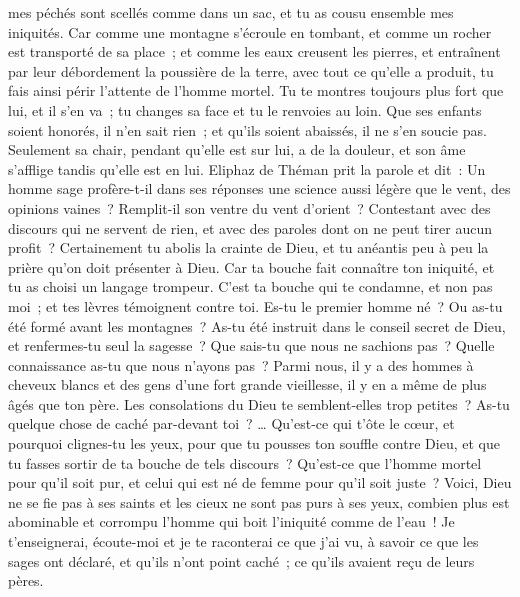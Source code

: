 \begin{multicols}{2}
mes péchés sont scellés comme dans un sac, et tu as cousu ensemble mes iniquités.
Car comme une montagne s'écroule en tombant, et comme un rocher est transporté de sa place~; 
 et comme les eaux creusent les pierres, et entraînent par leur débordement la poussière de la terre, avec tout ce qu'elle a produit, tu fais ainsi périr l'attente de l'homme mortel.
Tu te montres toujours plus fort que lui, et il s'en va~; tu changes sa face et tu le renvoies au loin.
Que ses enfants soient honorés, il n'en sait rien~; et qu'ils soient abaissés, il ne s'en soucie pas.
Seulement sa chair, pendant qu'elle est sur lui, a de la douleur, et son âme s'afflige tandis qu'elle est en lui.
\VerseOne{}Eliphaz de Théman prit la parole et dit~:
Un homme sage profère-t-il dans ses réponses une science aussi légère que le vent, des opinions vaines~? Remplit-il son ventre du vent d'orient~?
Contestant avec des discours qui ne servent de rien, et avec des paroles dont on ne peut tirer aucun profit~?
Certainement tu abolis la crainte de Dieu, et tu anéantis peu à peu la prière qu'on doit présenter à Dieu. 
 Car ta bouche fait connaître ton iniquité, et tu as choisi un langage trompeur. 
C'est ta bouche qui te condamne, et non pas moi~; et tes lèvres témoignent contre toi. 
Es-tu le premier homme né~? Ou as-tu été formé avant les montagnes~?
As-tu été instruit dans le conseil secret de Dieu, et renfermes-tu seul la sagesse~?
Que sais-tu que nous ne sachions pas~? Quelle connaissance as-tu que nous n'ayons pas~?
Parmi nous, il y a des hommes à cheveux blancs et des gens d'une fort grande vieillesse, il y en a même de plus âgés que ton père. 
Les consolations du Dieu te semblent-elles trop petites~? As-tu quelque chose de caché par-devant toi~? …
Qu'est-ce qui t'ôte le cœur, et pourquoi clignes-tu les yeux, 
pour que tu pousses ton souffle contre Dieu, et que tu fasses sortir de ta bouche de tels discours~? 
Qu'est-ce que l'homme mortel pour qu'il soit pur, et celui qui est né de femme pour qu'il soit juste~?
Voici, Dieu ne se fie pas à ses saints et les cieux ne sont pas purs à ses yeux,
combien plus est abominable et corrompu l'homme qui boit l'iniquité comme de l'eau~! 
Je t'enseignerai, écoute-moi et je te raconterai ce que j'ai vu,
à savoir ce que les sages ont déclaré, et qu'ils n'ont point caché~; ce qu'ils avaient reçu de leurs pères.

\end{multicols}
